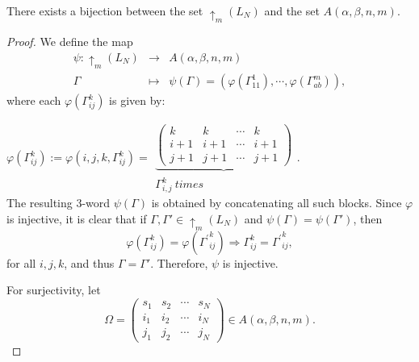 \documentclass[10pt,a4paper]{amsart}
\begin{document}
\begin{thm}\label{thm:3words-bijection}
There exists a bijection between the set \( \uparrow_m(L_N) \) and the set \( A(\alpha, \beta, n, m) \).
\end{thm}

\begin{proof}
    We define the map
    $$
    \begin{array}{ccl}
        \psi: \uparrow_{m}(L_N) & \longrightarrow & A(\alpha, \beta, n, m)  \\
        \Gamma & \longmapsto & \psi(\Gamma) = (\varphi(\Gamma_{11}^1), \cdots, \varphi(\Gamma_{ab}^m)),
    \end{array}
    $$
    where each $\varphi(\Gamma_{ij}^k)$ is given by:
    
    
    
     $\varphi(\Gamma_{ij}^k):=\varphi(i,j,k,\Gamma_{ij}^{k})=\begin{array}{c}
		\underbrace{\left(\begin{matrix}
				k&k&\cdots&k\\
				i+1&i+1&\cdots&i+1\\
				j+1&j+1&\cdots&j+1\end{matrix}\right)}\\ \Gamma_{i,j}^k\  times\end{array}$.\\
    
    
    

    The resulting 3-word $\psi(\Gamma)$ is obtained by concatenating all such blocks.
    Since $\varphi$ is injective, it is clear that if $\Gamma, \Gamma' \in \uparrow_{m}(L_N)$ and $\psi(\Gamma) = \psi(\Gamma')$, then
  $$
\varphi(\Gamma_{ij}^k) = \varphi({\Gamma^{\prime}}_{ij}^k) \Rightarrow \Gamma_{ij}^k = {\Gamma^{\prime}}_{ij}^k,
$$
    for all $i,j,k$, and thus $\Gamma = \Gamma'$. Therefore, $\psi$ is injective.

    For surjectivity, let
    $$
    \Omega = \begin{pmatrix}
        s_1 & s_2 & \cdots & s_N \\
        i_1 & i_2 & \cdots & i_N \\
        j_1 & j_2 & \cdots & j_N
    \end{pmatrix} \in A(\alpha, \beta, n, m) .
    $$


\end{proof}
\end{document}
